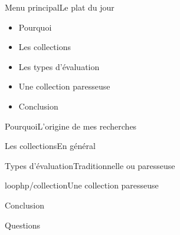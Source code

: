 





\begin{frame}[plain]
	\titlepage{}
\end{frame}

\newcommand\blankfootnote[1]{%
  \let\thefootnote\relax\footnotetext{#1}%
  \let\thefootnote\svthefootnote%
}

\begin{frame}{Menu principal}{Le plat du jour}
    \begin{itemize}
        \item Pourquoi
        \item Les collections
        \item Les types d'évaluation
        \item Une collection paresseuse
        \item Conclusion
    \end{itemize}
\end{frame}

\begin{frameD}{Pourquoi}{L'origine de mes recherches}

\end{frameD}



\begin{frameD}{Les collections}{En général}

\end{frameD}



\begin{frameD}{Types d'évaluation}{Traditionnelle ou paresseuse}

\end{frameD}



\begin{frameD}{loophp/collection}{Une collection paresseuse}

\end{frameD}



\begin{frameD}{Conclusion}

\end{frameD}



\begin{frameD}{Questions}

\end{frameD}


